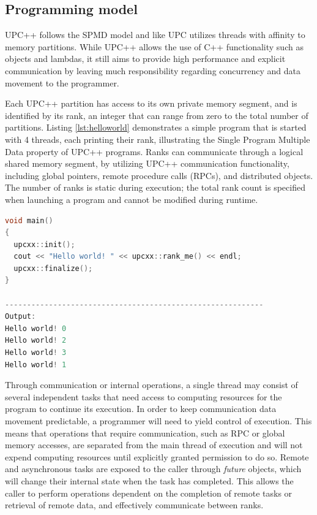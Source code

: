 \documentclass{uit-report}
\begin{document}
\subsection{Programming model}
UPC++ follows the SPMD model and like UPC utilizes threads with affinity to memory partitions. While UPC++ allows the use of C++ functionality such as objects and lambdas, it still aims to provide high performance and explicit communication by leaving much responsibility regarding concurrency and data movement to the programmer.

Each UPC++ partition has access to its own private memory segment, and is identified by its rank, an integer that can range from zero to the total number of partitions. Listing \ref{lst:helloworld} demonstrates a simple program that is started with 4 threads, each printing their rank, illustrating the Single Program Multiple Data property of UPC++ programs. Ranks can communicate through a logical shared memory segment, by utilizing UPC++ communication functionality, including global pointers, remote procedure calls (RPCs), and distributed objects. The number of ranks is static during execution; the total rank count is specified when launching a program and cannot be modified during runtime.


\begin{lstlisting}[label={lst:helloworld}, float, caption="Hello World"-program in UPC++ and its output, frame=tlrb, captionpos=b, language=c++, showstringspaces=false]
void main()
{
  upcxx::init();
  cout << "Hello world! " << upcxx::rank_me() << endl;
  upcxx::finalize();
}

-----------------------------------------------------------
Output:
Hello world! 0
Hello world! 2
Hello world! 3
Hello world! 1
\end{lstlisting}



Through communication or internal operations, a single thread may consist of several independent tasks that need access to computing resources for the program to continue its execution. In order to keep communication data movement predictable, a programmer will need to yield control of execution. This means that operations that require communication, such as RPC or global memory accesses, are separated from the main thread of execution and will not expend computing resources until explicitly granted permission to do so. Remote and asynchronous tasks are exposed to the caller through \emph{future} objects, which will change their internal state when the task has completed. This allows the caller to perform operations dependent on the completion of remote tasks or retrieval of remote data, and effectively communicate between ranks.
\end{document}
